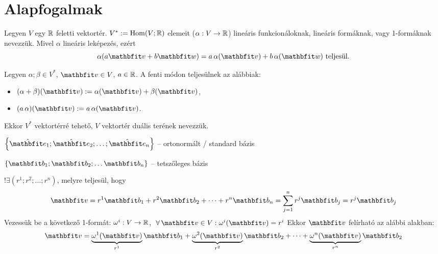 \clearpage
\section{Alapfogalmak}

\begin{definition}[Konvektor]
  Legyen $V$ egy $\mathbb{R}$ feletti vektortér. $V^* := \operatorname{Hom}
    (V; \mathbb{R})$ elemeit ($\alpha: V \rightarrow \mathbb{R}$) lineáris
  funkcionáloknak, lineáris formáknak, vagy 1-formáknak nevezzük.
  Mivel $\alpha$ lineáris leképezés, ezért
  $$
    \alpha(a \rvec v + b \rvec w)
    = a \, \alpha(\rvec v) + b \, \alpha(\rvec w)
    \text{ teljesül.}
  $$
\end{definition}

\begin{definition}
  Legyen $\alpha; \beta \in V^*$, $\rvec v \in V$, $a \in \mathbb{R}$. A fenti
  módon teljesülnek az alábbiak:
  \begin{itemize}
    \item $(\alpha + \beta)(\rvec v) := \alpha(\rvec v) + \beta(\rvec v)$,
    \item $(a \, \alpha)(\rvec v) := a \, \alpha(\rvec v)$.
  \end{itemize}
  Ekkor $V^*$ vektortérré tehető, $V$ vektortér duális terének nevezzük.
\end{definition}

\begin{note}
  \bullet \;\; ${\left\{ \uvec e_1; \uvec e_2; \dots; \uvec e_n \right\}}$
  -- ortonormált / standard bázis

  \bullet \;\; ${\left\{ \rvec b_1; \rvec b_2; \dots \rvec b_n \right\}}$
  -- tetszőleges bázis
\end{note}

\begin{note}
  $!\exists \left( r^1; r^2; \dots; r^n \right)$,
  melyre teljesül, hogy
  $$
    \rvec v
    = r^1 \rvec b_1
    + r^2 \rvec b_2
    + \dots
    + r^n \rvec b_n
    = \sum_{j=1}^n r^j \rvec b_j
    = {r^j \rvec b_j}
  $$
  Vezessük be a következő 1-formát:
  $\omega^i: V \rightarrow \mathbb{R}$,
  $\; \forall \, \rvec v \in V: \omega^i(\rvec v) = r^i$
  Ekkor $\rvec v$ felírható az alábbi alakban:
  $$
    \rvec v
    = \underbrace{\omega^1(\rvec v)}_{r^1} \rvec b_1
    + \underbrace{\omega^2(\rvec v)}_{r^2} \rvec b_2
    + \dots
    + \underbrace{\omega^n(\rvec v)}_{r^n} \rvec b_2
  $$
\end{note}

